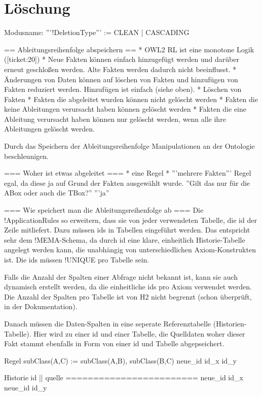 \section{Löschung}
Modusname: '''!DeletionType''' := CLEAN | CASCADING

== Ableitungsreihenfolge abspeichern ==
 * OWL2 RL ist eine monotone Logik ([ticket:20])
   * Neue Fakten können einfach hinzugefügt werden und darüber erneut geschloßen werden. Alte Fakten werden dadurch nicht beeinflusst.
   * Änderungen von Daten können auf löschen von Fakten und hinzufügen von Fakten reduziert werden. Hinzufügen ist einfach (siehe oben).
   * Löschen von Fakten
     * Fakten die abgeleitet wurden können nicht gelöscht werden
     * Fakten die keine Ableitungen verursacht haben können gelöscht werden
     * Fakten die eine Ableitung verursacht haben können nur gelöscht werden, wenn alle ihre Ableitungen gelöscht werden.

Durch das Speichern der Ableitungsreihenfolge Manipulationen an der Ontologie beschleunigen.

=== Woher ist etwas abgeleitet ===
 * eine Regel
 * '''mehrere Fakten'''
Regel egal, da diese ja auf Grund der Fakten ausgewählt wurde.
''Gilt das nur für die ABox oder auch die TBox?'' '''ja''

=== Wie speichert man die Ableitungsreihenfolge ab ===
Die !ApplicationRules so erweitern, dass sie von jeder verwendeten Tabelle, die id der Zeile mitliefert. Dazu müssen ids in Tabellen eingeführt werden. Das entspricht sehr dem !MEMA-Schema, da durch id eine klare, einheitlich Historie-Tabelle angelegt werden kann, die unabhängig von unterschiedlichen Axiom-Konstrukten ist. Die ids müssen !UNIQUE pro Tabelle sein.

Falls die Anzahl der Spalten einer Abfrage nicht bekannt ist, kann sie auch dynamisch erstellt werden, da die einheitliche ids pro Axiom verwendet werden. Die Anzahl der Spalten pro Tabelle ist von H2 nicht begrenzt (schon überprüft, in der Dokumentation).

Danach müssen die Daten-Spalten in eine seperate Referenztabelle (Historien-Tabelle). Hier wird zu einer id und einer Tabelle, die Quelldaten woher dieser Fakt stammt ebenfalls in Form von einer id und Tabelle abgepseichert.

Regel
subClass(A,C) := subClass(A,B), subClass(B,C)
 neue\_id             id\_x           id\_y

Historie
   id      ||   quelle
========================
 neue\_id         id\_x
 neue\_id         id\_y 


